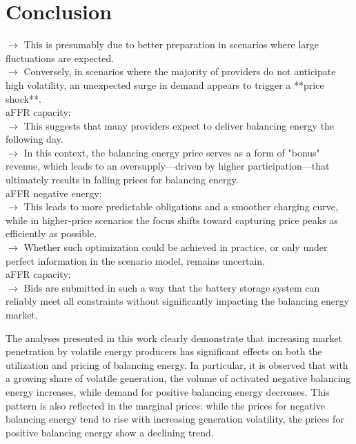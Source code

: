 \chapter{Conclusion}

$\rightarrow$ This is presumably due to better preparation in scenarios where large fluctuations are expected.\\
$\rightarrow$ Conversely, in scenarios where the majority of providers do not anticipate high volatility, an unexpected surge in demand appears to trigger a **price shock**.\\


aFFR capacity:\\
$\rightarrow$ This suggests that many providers expect to deliver balancing energy the following day.\\
$\rightarrow$ In this context, the balancing energy price serves as a form of "bonus" revenue, which leads to an oversupply—driven by higher participation—that ultimately results in falling prices for balancing energy.\\

aFFR negative energy:\\
$\rightarrow$ This leads to more predictable obligations and a smoother charging curve, while in higher-price scenarios the focus shifts toward capturing price peaks as efficiently as possible.\\
$\rightarrow$ Whether such optimization could be achieved in practice, or only under perfect information in the scenario model, remains uncertain.\\

aFFR capacity:\\
$\rightarrow$ Bids are submitted in such a way that the battery storage system can reliably meet all constraints without significantly impacting the balancing energy market.\\


The analyses presented in this work clearly demonstrate that increasing market penetration by volatile energy producers
has significant effects on both the utilization and pricing of balancing energy. In particular,
it is observed that with a growing share of volatile generation, the volume of activated negative balancing energy increases,
while demand for positive balancing energy decreases. This pattern is also reflected in the marginal prices: while the prices
for negative balancing energy tend to rise with increasing generation volatility, the prices for positive balancing energy show
a declining trend.

